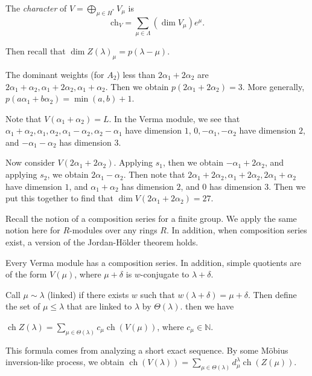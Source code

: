 \documentclass[twoside, 10pt]{article}
\begin{document}
    \begin{defn} The \textit{character} of $V = \bigoplus_{\mu \in H^*}
        V_{\mu}$ is \[ \mathrm{ch}_V = \sum_{\mu \in \Lambda} (\dim V_{\mu})
        e^{\mu}. \] \end{defn}

    Then recall that $\dim Z(\lambda)_{\mu} = p(\lambda - \mu)$.

    \begin{exm} The dominant weights (for $A_2$) less than $2 \alpha_1 + 2
        \alpha_2$ are $2 \alpha_1 + \alpha_2, \alpha_1 + 2 \alpha_2, \alpha_1 +
        \alpha_2$. Then we obtain $p(2 \alpha_1 + 2 \alpha_2) = 3$. More
        generally, $p(a\alpha_1 + b \alpha_2) = \min(a,b) + 1$.  \end{exm}

    \begin{exm} Note that $V(\alpha_1 + \alpha_2) = L$. In the Verma module, we
        see that $\alpha_1 + \alpha_2, \alpha_1, \alpha_2, \alpha_1 - \alpha_2,
        \alpha_2 - \alpha_1$ have dimension $1$, $0, -\alpha_1, -\alpha_2$ have
        dimension $2$, and $-\alpha_1 - \alpha_2$ has dimension $3$.  \end{exm}

    Now consider $V(2\alpha_1 + 2 \alpha_2)$. Applying $s_1$, then we obtain
    $-\alpha_1 + 2 \alpha_2$, and applying $s_2$, we obtain $2 \alpha_1 -
    \alpha_2$. Then note that $2 \alpha_1 + 2 \alpha_2, \alpha_1 + 2 \alpha_2,
    2 \alpha_1 + \alpha_2$ have dimension $1$, and $\alpha_1 + \alpha_2$ has
    dimension $2$, and $0$ has dimension $3$. Then we put this together to find
    that $\dim V(2 \alpha_1 + 2 \alpha_2) = 27$.

    Recall the notion of a composition series for a finite group. We apply the
    same notion here for $R$-modules over any rings $R$. In addition, when
    composition series exist, a version of the Jordan-H\"older theorem holds.

    \begin{thm} Every Verma module has a composition series. In addition,
    simple quotients are of the form $V(\mu)$, where $\mu + \delta$ is
$w$-conjugate to $\lambda + \delta$.  \end{thm}

    Call $\mu \sim \lambda$ (linked) if there exists $w$ such that $w(\lambda +
    \delta) = \mu + \delta$. Then define the set of $\mu \leq \lambda$ that are
    linked to $\lambda$ by $\Theta(\lambda)$. then we have \begin{cor}
        $\operatorname{ch} Z(\lambda) = \sum_{\mu \in \Theta(\lambda)} c_{\mu}
        \operatorname{ch}(V(\mu))$, where $c_{\mu} \in \mathbb{N}$.  \end{cor}
        This formula comes from analyzing a short exact sequence. By some
        M\"obius inversion-like process, we obtain
        $\operatorname{ch}(V(\lambda)) = \sum_{\mu \in \Theta(\lambda)}
        d_{\mu}^{\lambda} \operatorname{ch}(Z(\mu))$.
\end{document}
